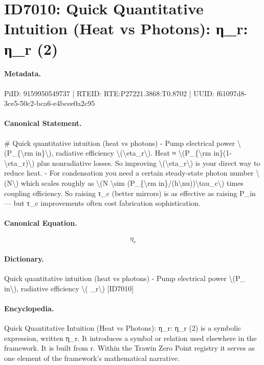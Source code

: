\section*{ID7010: Quick Quantitative Intuition (Heat vs Photons): η\_r: η\_r (2)}
\paragraph{Metadata.}
PiID: 9159950549737 | RTEID: RTE:P27221.3868:T0.8702 | UUID: f61097d8-3ce5-50c2-bca6-e4bcee0a2c95

\paragraph{Canonical Statement.}
\# Quick quantitative intuition (heat vs photons) - Pump electrical power \textbackslash{}(P\_\{\textbackslash{}rm in\}\textbackslash{}), radiative efficiency \textbackslash{}(\textbackslash{}eta\_r\textbackslash{}). Heat ≈ \textbackslash{}(P\_\{\textbackslash{}rm in\}(1-\textbackslash{}eta\_r)\textbackslash{}) plus nonradiative losses. So improving \textbackslash{}(\textbackslash{}eta\_r\textbackslash{}) is your direct way to reduce heat. - For condensation you need a certain steady-state photon number \textbackslash{}(N\textbackslash{}) which scales roughly as \textbackslash{}(N \textbackslash{}sim (P\_\{\textbackslash{}rm in\}/(h\textbackslash{}nu))\textbackslash{}tau\_c\textbackslash{}) times coupling efficiency. So raising τ\_c (better mirrors) is as effective as raising P\_in — but τ\_c improvements often cost fabrication sophistication.

\paragraph{Canonical Equation.}
\[
\eta_r
\]

\paragraph{Dictionary.}
Quick quantitative intuition (heat vs photons) - Pump electrical power \textbackslash{}(P\_ in\textbackslash{}), radiative efficiency \textbackslash{}( \_r\textbackslash{}) [ID7010]

\paragraph{Encyclopedia.}
Quick Quantitative Intuition (Heat vs Photons): η\_r: η\_r (2) is a symbolic expression, written η\_r. It introduces a symbol or relation used elsewhere in the framework. It is built from r. Within the Trawin Zero Point registry it serves as one element of the framework's mathematical narrative.
